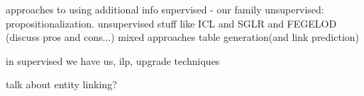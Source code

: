 \documentclass[twoside,11pt]{article}
\theoremstyle{definition}
\begin{document}
approaches to using additional info
	supervised - our family
	unsupervised: propositionalization. unsupervised stuff like ICL and SGLR and FEGELOD (discuss pros and cons...)
	mixed approaches table generation(and link prediction)

in supervised we have us, ilp, upgrade techniques


talk about entity linking?




\end{document}
